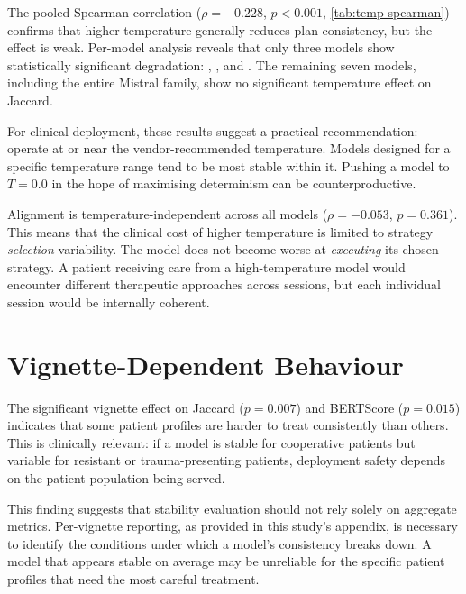The pooled Spearman correlation ($\rho = -0.228$, $p < 0.001$,
\autoref{tab:temp-spearman}) confirms that higher temperature generally
reduces plan consistency, but the effect is weak. Per-model analysis
reveals that only three models show statistically significant degradation: , ,
and . The remaining seven models, including the
entire Mistral family, show no significant temperature effect on Jaccard.

For clinical deployment, these results suggest a practical recommendation:
operate at or near the vendor-recommended temperature. Models designed for
a specific temperature range tend to be most stable within it. Pushing a
model to $T = 0.0$ in the hope of maximising determinism can be
counterproductive.

Alignment is temperature-independent across all models ($\rho = -0.053$,
$p = 0.361$). This means that the clinical cost of higher temperature is
limited to strategy \emph{selection} variability. The model does not become
worse at \emph{executing} its chosen strategy. A patient receiving care
from a high-temperature model would encounter different therapeutic
approaches across sessions, but each individual session would be internally
coherent.


\section{Vignette-Dependent Behaviour}
\label{sec:disc-vignettes}

The significant vignette effect on Jaccard ($p = 0.007$) and BERTScore
($p = 0.015$) indicates that some patient profiles are harder to treat
consistently than others. This is clinically relevant: if a model is stable
for cooperative patients but variable for resistant or trauma-presenting
patients, deployment safety depends on the patient population being served.

This finding suggests that stability evaluation should not rely solely on
aggregate metrics. Per-vignette reporting, as provided in this study's
appendix, is necessary to identify the conditions under which a model's
consistency breaks down. A model that appears stable on average may be
unreliable for the specific patient profiles that need the most careful
treatment.


